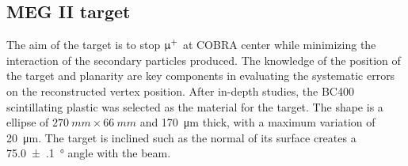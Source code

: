 \begin{refsection}
    \subsection{MEG II target}
    \label{sec:MEG:target}
        The aim of the target is to stop $\upmu^+$ at COBRA center while minimizing the interaction of the secondary particles produced.
        The knowledge of the position of the target and planarity are key components in evaluating the systematic errors on the reconstructed vertex position. 
        After in-depth studies, the BC400 scintillating plastic was selected as the material for the target.
        The shape is a ellipse of $\SI{270}{mm}\times\SI{66}{mm}$ and \SI{170}{\micro m} thick, with a maximum variation of \SI{20}{\micro m}. 
        The target is inclined such as the normal of its surface creates a \SI{75.0(1)}{\degree} angle with the beam. 
        

\end{refsection}
